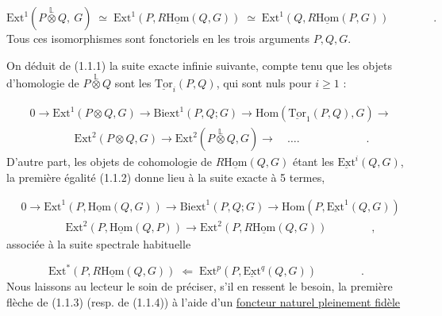 \begin{equation}\tag{1.1.2}
\mathrm{Ext}^1(P\overset{\mathbb{L}}{\otimes}Q,\ G) \;\simeq\; \mathrm{Ext}^1(P,R\underline{\mathrm{Hom}}(Q,G)) \;\simeq\; \mathrm{Ext}^1(Q,R\underline{\mathrm{Hom}}(P,G)) \qquad\qquad .
\end{equation}
Tous ces isomorphismes sont fonctoriels en les trois arguments $P,Q,G$.

On déduit de (1.1.1) la suite exacte infinie suivante, compte tenu que les objets d'homologie de $P\overset{\mathbb{L}}{\otimes}Q$ sont les $\underline{\mathrm{Tor}}_i(P,Q)$, qui sont nuls pour $i \geqslant 1$ :

\begin{equation}\tag{1.1.3}
\begin{aligned}
&0 \longrightarrow \mathrm{Ext}^1(P\otimes Q,G) \longrightarrow \mathrm{Biext}^1(P,Q;G) \longrightarrow \mathrm{Hom}(\underline{\mathrm{Tor}}_1(P,Q),G) \longrightarrow \\
&\qquad\qquad \mathrm{Ext}^2(P\otimes Q,G) \longrightarrow \mathrm{Ext}^2(P\overset{\mathbb{L}}{\otimes} Q,G) \longrightarrow \quad \ldots. \qquad\qquad\qquad .
\end{aligned}
\end{equation}
D'autre part, les objets de cohomologie de $R\underline{\mathrm{Hom}}(Q,G)$ étant les $\underline{\mathrm{Ext}}^i(Q,G)$, la première égalité (1.1.2) donne lieu à la suite exacte à 5 termes,

\begin{equation}\tag{1.1.4}
\begin{aligned}
&0 \longrightarrow \mathrm{Ext}^1(P,\underline{\mathrm{Hom}}(Q,G)) \longrightarrow \mathrm{Biext}^1(P,Q;G) \longrightarrow \mathrm{Hom}(P,\underline{\mathrm{Ext}}^1(Q,G)) \\
&\qquad\qquad \mathrm{Ext}^2(P,\underline{\mathrm{Hom}}(Q,P)) \longrightarrow \mathrm{Ext}^2(P,R\underline{\mathrm{Hom}}(Q,G)) \qquad\qquad ,
\end{aligned}
\end{equation}
associée à la suite spectrale habituelle

\begin{equation*}
\mathrm{Ext}^*(P,R\underline{\mathrm{Hom}}(Q,G)) \;\Longleftarrow\; \mathrm{Ext}^p(P,\underline{\mathrm{Ext}}^q(Q,G)) \qquad\qquad .
\end{equation*}
Nous laissons au lecteur le soin de préciser, s'il en ressent le besoin, la première flèche de (1.1.3) (resp. de (1.1.4)) à l'aide d'un \underline{foncteur naturel pleinement fidèle}

